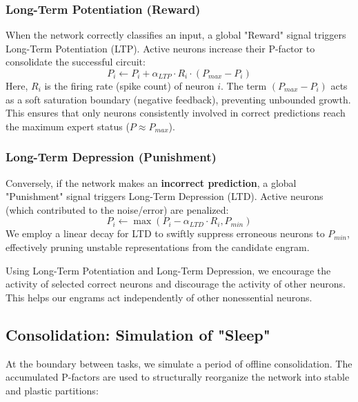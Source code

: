 \documentclass[5p,times]{elsarticle}
\begin{document}
\subsubsection{Long-Term Potentiation (Reward)}
When the network correctly classifies an input, a global "Reward" signal triggers Long-Term Potentiation (LTP). Active neurons increase their P-factor to consolidate the successful circuit:
\begin{equation}
    P_i \leftarrow P_i + \alpha_{LTP} \cdot R_i \cdot (P_{max} - P_i)
\end{equation}
Here, $R_i$ is the firing rate (spike count) of neuron $i$. The term $(P_{max} - P_i)$ acts as a soft saturation boundary (negative feedback), preventing unbounded growth. This ensures that only neurons consistently involved in correct predictions reach the maximum expert status ($P \approx P_{max}$).


\subsubsection{Long-Term Depression (Punishment)}
Conversely, if the network makes an \textbf{incorrect prediction}, a global "Punishment" signal triggers Long-Term Depression (LTD). Active neurons (which contributed to the noise/error) are penalized:
\begin{equation}
    P_i \leftarrow \max(P_i - \alpha_{LTD} \cdot R_i, P_{min})
\end{equation}
We employ a linear decay for LTD to swiftly suppress erroneous neurons to $P_{min}$, effectively pruning unstable representations from the candidate engram.

Using Long-Term Potentiation and Long-Term Depression, we encourage the activity of selected correct neurons and discourage the activity of other neurons. This helps our engrams act independently of other nonessential neurons.

\subsection{Consolidation: Simulation of "Sleep"}
At the boundary between tasks, we simulate a period of offline consolidation. The accumulated P-factors are used to structurally reorganize the network into stable and plastic partitions:
\end{document}

